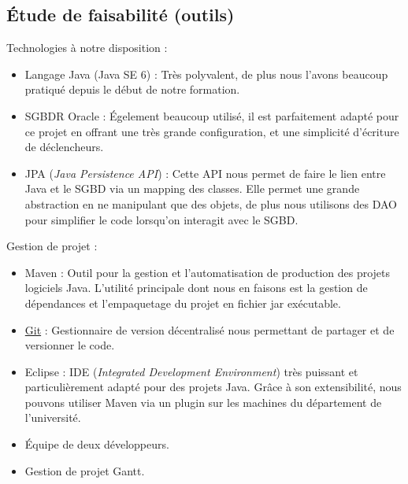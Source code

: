 \documentclass{article}
\begin{document}
\newpage
\subsection{\'Etude de faisabilité (outils)}
Technologies à notre disposition :
\begin{itemize}
\item Langage Java (Java SE 6) : Très polyvalent, de plus nous l'avons beaucoup pratiqué depuis le début de notre formation.
\item SGBDR Oracle : \'Egelement beaucoup utilisé, il est parfaitement adapté pour ce projet en offrant une très grande configuration, et une simplicité d'écriture de déclencheurs.
\item JPA (\textit{Java Persistence API}) : Cette API nous permet de faire le lien entre Java et le SGBD via un mapping des classes. Elle permet une grande abstraction en ne manipulant que des objets, de plus nous utilisons des DAO pour simplifier le code lorsqu'on interagit avec le SGBD.\\
\end{itemize}

Gestion de projet :
\begin{itemize}
\item Maven : Outil pour la gestion et l'automatisation de production des projets logiciels Java. L'utilité principale dont nous en faisons est la gestion de dépendances et l'empaquetage du projet en fichier jar exécutable.
\item \href{https://github.com/perelo/Schedule}{Git} : Gestionnaire de version décentralisé nous permettant de partager et de versionner le code.
\item Eclipse : IDE (\textit{Integrated Development Environment}) très puissant et particulièrement adapté pour des projets Java. Grâce à son extensibilité, nous pouvons utiliser Maven via un plugin sur les machines du département de l'université.
\item \'Equipe de deux développeurs.
\item Gestion de projet Gantt.
\end{itemize}
\end{document}
